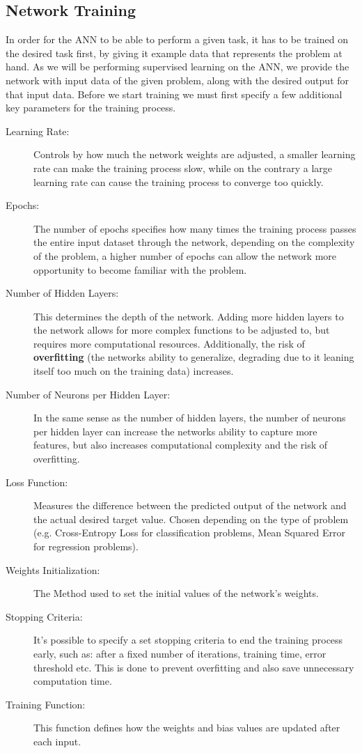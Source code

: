 \subsection{Network Training}
In order for the ANN to be able to perform a given task, it has to be trained on the desired task first, by giving it example data that represents the problem at hand. As we will be performing supervised learning on the ANN, we provide the network with input data of the given problem, along with the desired output for that input data. Before we start training we must first specify a few additional key parameters for the training process.

\begin{description}
    \item[Learning Rate:] Controls by how much the network weights are adjusted, a smaller learning rate can make the training process slow, while on the contrary a large learning rate can cause the training process to converge too quickly.
    \item[Epochs:] The number of epochs specifies how many times the training process passes the entire input dataset through the network, depending on the complexity of the problem, a higher number of epochs can allow the network more opportunity to become familiar with the problem.
    \item[Number of Hidden Layers:] This determines the depth of the network. Adding more hidden layers to the network allows for more complex functions to be adjusted to, but requires more computational resources. Additionally, the risk of \textbf{overfitting} (the networks ability to generalize, degrading due to it leaning itself too much on the training data) increases.
    \item[Number of Neurons per Hidden Layer:] In the same sense as the number of hidden layers, the number of neurons per hidden layer can increase the networks ability to capture more features, but also increases computational complexity and the risk of overfitting.
    \item[Loss Function:] Measures the difference between the predicted output of the network and the actual desired target value. Chosen depending on the type of problem (e.g. Cross-Entropy Loss for classification problems, Mean Squared Error for regression problems).
    \item[Weights Initialization:] The Method used to set the initial values of the network's weights.
    \item[Stopping Criteria:] It's possible to specify a set stopping criteria to end the training process early, such as: after a fixed number of iterations, training time, error threshold etc. This is done to prevent overfitting and also save unnecessary computation time. 
    \item[Training Function:] This function defines how the weights and bias values are updated after each input. 
 \end{description}
